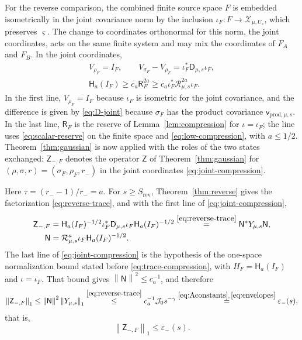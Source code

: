 \documentclass[11pt]{amsart}
\numberwithin{equation}{section}
\theoremstyle{definition}
\newcommand{\vv}{\mathsf v}
\newcommand{\Res}{\mathsf R}
\newcommand{\JointRes}{\mathcal R}
\newcommand{\JointD}{\mathsf D}
\newcommand{\Therm}{\mathsf H}
\newcommand{\norm}[1]{\left\|#1\right\|}
\begin{document}
For the reverse comparison, the combined finite source space \(F\) is
embedded isometrically in the joint covariance norm by the inclusion
\(\iota_F\colon F\to\mathcal X_{\mu,U_s}\), which preserves \(\varsigma\).
The change to coordinates orthonormal for this norm, the joint
coordinates, acts on the same finite system and may mix the
coordinates of \(F_A\) and \(F_B\). In the joint coordinates,
\begin{equation}
 \begin{gathered}
 V_{\rho_F}=I_F,\qquad
 V_{\sigma_F}-V_{\rho_F}
 =\iota_F^*\JointD_{\mu,s}\iota_F,\\
 \Therm_a(I_F)\ge c_a\Res_F^{2a}
 \ge c_a\iota_F^*\JointRes_{\mu,s}^{2a}\iota_F.
 \end{gathered}
 \label{eq:joint-compression}
\end{equation}
In the first line, \(V_{\rho_F}=I_F\) because \(\iota_F\) is isometric
for the joint covariance, and the difference is given by
\eqref{eq:D-joint} because \(\sigma_F\) has the product covariance
\(\vv_{\mathrm{prod},\mu,s}\). In the last line,
\(\Res_F\) is the reserve of
Lemma~\ref{lem:compression} for \(\iota=\iota_F\); the line uses
\eqref{eq:scalar-reserve} on the finite space and
\eqref{eq:low-compression}, with \(a\le1/2\). Theorem~\ref{thm:gaussian} is now applied
with the roles of the two states exchanged:
\(\mathsf Z_{-,F}\) denotes the operator \(\mathsf Z\) of
Theorem~\ref{thm:gaussian} for
\((\rho,\sigma,r)=(\sigma_F,\rho_F,r_-)\) in the joint coordinates
\eqref{eq:joint-compression}.

Here \(\tau=(r_--1)/r_-=a\). For \(s\ge S_{\mathrm{rev}}\),
Theorem~\ref{thm:reverse} gives the factorization
\eqref{eq:reverse-trace}, and with the first line of
\eqref{eq:joint-compression},
\begin{align*}
 \mathsf Z_{-,F}
 &=\Therm_a(I_F)^{-1/2}\iota_F^*\JointD_{\mu,s}\iota_F\Therm_a(I_F)^{-1/2}
 \overset{\eqref{eq:reverse-trace}}{=}\mathsf N^*Y_{\mu,s}\mathsf N,\\
 \mathsf N&=\JointRes_{\mu,s}^a\iota_F\Therm_a(I_F)^{-1/2}.
\end{align*}
The last line of \eqref{eq:joint-compression} is the hypothesis of
the one-space normalization bound stated before
\eqref{eq:trace-compression}, with \(H_F=\Therm_a(I_F)\) and
\(\iota=\iota_F\). That bound gives \(\norm{\mathsf N}^2\le c_a^{-1}\),
and therefore
\[
 \norm{\mathsf Z_{-,F}}_1
 \le\norm{\mathsf N}^2\norm{Y_{\mu,s}}_1
 \overset{\eqref{eq:reverse-trace}}{\le}c_a^{-1}\mathcal J_0s^{-\gamma}
 \overset{\eqref{eq:Aconstants},\,\eqref{eq:envelopes}}{=}\varepsilon_-(s),
\]
that is,
\begin{equation}
 \norm{\mathsf Z_{-,F}}_1\le\varepsilon_-(s).
 \label{eq:finite-reverse}
\end{equation}
\end{document}
